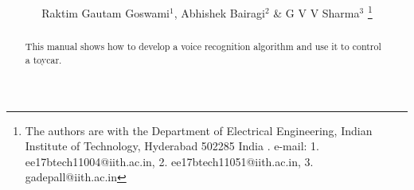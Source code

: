 \documentclass[journal,12pt,twocolumn]{IEEEtran}
\begin{document}
\def\putbox#1#2#3{\makebox[0in][l]{\makebox[#1][l]{}\raisebox{\baselineskip}[0in][0in]{\raisebox{#2}[0in][0in]{#3}}}}
     \def\rightbox#1{\makebox[0in][r]{#1}}
     \def\centbox#1{\makebox[0in]{#1}}
     \def\topbox#1{\raisebox{-\baselineskip}[0in][0in]{#1}}
     \def\midbox#1{\raisebox{-0.5\baselineskip}[0in][0in]{#1}}

\vspace{3cm}

\title{ 
}
\author{Raktim Gautam Goswami$^{1}$, Abhishek Bairagi$^{2}$ \& G V V Sharma$^{3}$ 
\thanks{The authors are with the Department
of Electrical Engineering, Indian Institute of Technology, Hyderabad
502285 India .  e-mail: 1. ee17btech11004@iith.ac.in, 2. ee17btech11051@iith.ac.in,  
3. gadepall@iith.ac.in}%
}




\maketitle


\tableofcontents

\renewcommand{\thefigure}{\theenumi}
\renewcommand{\thetable}{\theenumi}


\bigskip

\begin{abstract}
%
This manual shows how to develop a voice recognition algorithm and use it to 
control a toycar. 
%
\end{abstract}
\end{document}
